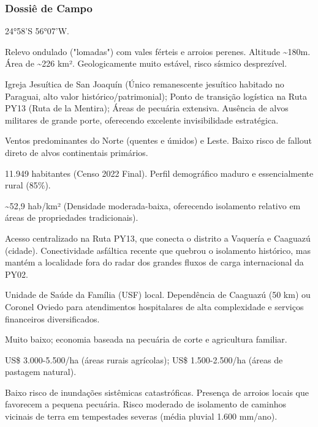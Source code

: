 \subsubsection{Dossiê de Campo}
\begin{description}[style=nextline,leftmargin=0.5cm,font=\bfseries]
\item[Coordenadas]  24°58'S 56°07'W.
\item[Topografia]  Relevo ondulado ("lomadas") com vales férteis e arroios perenes. Altitude \textasciitilde 180m. Área de \textasciitilde 226 km². Geologicamente muito estável, risco sísmico desprezível.
\item[Alvos Estratégicos]  Igreja Jesuítica de San Joaquín (Único remanescente jesuítico habitado no Paraguai, alto valor histórico/\allowbreak patrimonial); Ponto de transição logística na Ruta PY13 (Ruta de la Mentira); Áreas de pecuária extensiva. Ausência de alvos militares de grande porte, oferecendo excelente invisibilidade estratégica.
\item[Fallout]  Ventos predominantes do Norte (quentes e úmidos) e Leste. Baixo risco de fallout direto de alvos continentais primários.
\item[População]  11.949 habitantes (Censo 2022 Final). Perfil demográfico maduro e essencialmente rural (85\%).
\item[Densidade]  \textasciitilde 52,9 hab/\allowbreak km² (Densidade moderada-baixa, oferecendo isolamento relativo em áreas de propriedades tradicionais).
\item[Vias de Acesso]  Acesso centralizado na Ruta PY13, que conecta o distrito a Vaquería e Caaguazú (cidade). Conectividade asfáltica recente que quebrou o isolamento histórico, mas mantém a localidade fora do radar dos grandes fluxos de carga internacional da PY02.
\item[Serviços]  Unidade de Saúde da Família (USF) local. Dependência de Caaguazú (50 km) ou Coronel Oviedo para atendimentos hospitalares de alta complexidade e serviços financeiros diversificados.
\item[Custo de Vida]  Muito baixo; economia baseada na pecuária de corte e agricultura familiar.
\item[Preço da Terra]  US\$ 3.000-5.500/\allowbreak ha (áreas rurais agrícolas); US\$ 1.500-2.500/\allowbreak ha (áreas de pastagem natural).
\item[Hidrologia]  Baixo risco de inundações sistêmicas catastróficas. Presença de arroios locais que favorecem a pequena pecuária. Risco moderado de isolamento de caminhos vicinais de terra em tempestades severas (média pluvial 1.600 mm/\allowbreak ano).

\end{description}
